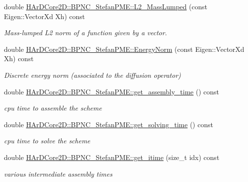 \begin{DoxyCompactItemize}
\mbox{\label{group__BPNC_ga54ab7a35ac7ccb83fc678aee96eb5dc3}} 
double \hyperlink{group__BPNC_ga54ab7a35ac7ccb83fc678aee96eb5dc3}{H\+Ar\+D\+Core2\+D\+::\+B\+P\+N\+C\+\_\+\+Stefan\+P\+M\+E\+::\+L2\+\_\+\+Mass\+Lumped} (const Eigen\+::\+Vector\+Xd Xh) const
\begin{DoxyCompactList}\small\item\em Mass-\/lumped L2 norm of a function given by a vector. \end{DoxyCompactList}\item 
\mbox{\label{group__BPNC_ga494151015dbd833a691e50f78966c82d}} 
double \hyperlink{group__BPNC_ga494151015dbd833a691e50f78966c82d}{H\+Ar\+D\+Core2\+D\+::\+B\+P\+N\+C\+\_\+\+Stefan\+P\+M\+E\+::\+Energy\+Norm} (const Eigen\+::\+Vector\+Xd Xh) const
\begin{DoxyCompactList}\small\item\em Discrete energy norm (associated to the diffusion operator) \end{DoxyCompactList}\item 
\mbox{\label{group__BPNC_gade729cb0357bb3f3476c2335a37b822d}} 
double \hyperlink{group__BPNC_gade729cb0357bb3f3476c2335a37b822d}{H\+Ar\+D\+Core2\+D\+::\+B\+P\+N\+C\+\_\+\+Stefan\+P\+M\+E\+::get\+\_\+assembly\+\_\+time} () const
\begin{DoxyCompactList}\small\item\em cpu time to assemble the scheme \end{DoxyCompactList}\item 
\mbox{\label{group__BPNC_ga90122c6a87891a16e7bc19edcfde175c}} 
double \hyperlink{group__BPNC_ga90122c6a87891a16e7bc19edcfde175c}{H\+Ar\+D\+Core2\+D\+::\+B\+P\+N\+C\+\_\+\+Stefan\+P\+M\+E\+::get\+\_\+solving\+\_\+time} () const
\begin{DoxyCompactList}\small\item\em cpu time to solve the scheme \end{DoxyCompactList}\item 
\mbox{\label{group__BPNC_ga1cdc2dc9af6aa57d315e6660453641f7}} 
double \hyperlink{group__BPNC_ga1cdc2dc9af6aa57d315e6660453641f7}{H\+Ar\+D\+Core2\+D\+::\+B\+P\+N\+C\+\_\+\+Stefan\+P\+M\+E\+::get\+\_\+itime} (size\+\_\+t idx) const
\begin{DoxyCompactList}\small\item\em various intermediate assembly times \end{DoxyCompactList}\item 

\end{DoxyCompactItemize}
